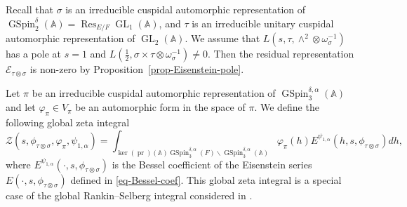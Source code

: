 \documentclass[12pt]{amsart}
\newcommand{\A}{\mathbb{A}}
\newcommand{\Res}{\operatorname{Res}}
\newcommand{\CE}{{\mathcal{E}}}
\theoremstyle{remark}
\newcommand{\pr}{\operatorname{pr}}
\DeclareMathOperator{\GL}{GL}
\DeclareMathOperator{\GSpin}{GSpin}
\begin{document}
Recall that $\sigma$ is an irreducible cuspidal automorphic representation of $\GSpin_2^{\delta}(\A)=\Res_{E/F} \GL_1(\A)$, and $\tau$ is an irreducible unitary cuspidal automorphic representation of $\GL_{2}(\A)$.
We assume that $L(s, \tau, \wedge^2\otimes \omega_\sigma^{-1})$ has a pole at $s=1$ and $L(\frac{1}{2}, \sigma\times \tau\otimes \omega_\sigma^{-1})\neq 0$. Then the residual representation $\CE_{\tau\otimes\sigma}$ is non-zero by  Proposition~\ref{prop-Eisenstein-pole}.
 
Let $\pi$ be an irreducible cuspidal automorphic representation of $\GSpin_3^{\delta,\alpha}(\A)$ and let $\varphi_\pi\in V_\pi$ be an automorphic form in the space of $\pi$. We define the following global zeta integral
\begin{equation}
\label{eq-JL-eq1}
\mathcal{Z}(s, \phi_{\tau\otimes\sigma}, \varphi_\pi, \psi_{1,\alpha})=\int_{\ker(\pr)(\A) \GSpin_3^{\delta,\alpha}(F)\backslash \GSpin_3^{\delta,\alpha}(\A) }	\varphi_\pi(h) E^{\psi_{1,\alpha}}(h, s, \phi_{\tau\otimes\sigma}) dh,
\end{equation}
where $E^{\psi_{1,\alpha}}(\cdot , s, \phi_{\tau\otimes\sigma})$ is the Bessel coefficient of the Eisenstein series $E(\cdot , s, \phi_{\tau\otimes\sigma})$ defined in \eqref{eq-Bessel-coef}. 
This global zeta integral is a special case of the global Rankin--Selberg integral considered in \cite{Yan2025GGP}. 
\end{document}
